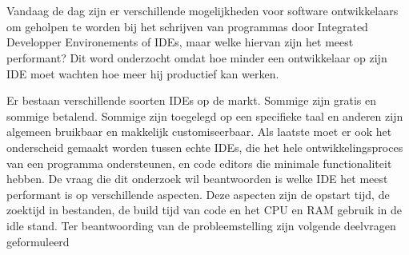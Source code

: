 
%
%

%



\chapter*{}

Vandaag de dag zijn er verschillende mogelijkheden voor software ontwikkelaars om geholpen te worden bij het schrijven van programmas door Integrated Developper Environements of IDEs, maar welke hiervan zijn het meest performant? Dit word onderzocht omdat hoe minder een ontwikkelaar op zijn IDE moet wachten hoe meer hij productief kan werken.

Er bestaan verschillende soorten IDEs op de markt. Sommige zijn gratis en sommige betalend. Sommige zijn toegelegd op een specifieke taal en anderen zijn algemeen bruikbaar en makkelijk customiseerbaar. Als laatste moet er ook het onderscheid gemaakt worden tussen echte IDEs, die het hele ontwikkelingsproces van een programma ondersteunen, en code editors die minimale functionaliteit hebben. De vraag die dit onderzoek wil beantwoorden is welke IDE het meest performant is op verschillende aspecten. Deze aspecten zijn de opstart tijd, de zoektijd in bestanden, de build tijd van code en het CPU en RAM gebruik in de idle stand. 
Ter beantwoording van de probleemstelling zijn volgende deelvragen geformuleerd

